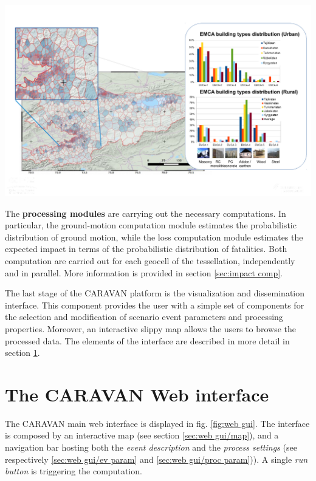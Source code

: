 \documentclass[12p]{article}
\begin{document}
\begin{center}
	\includegraphics[width=\textwidth]{tess_exposure1}
\end{center}

The \textbf{processing modules} are carrying out the necessary
computations. In particular, the ground-motion computation module estimates the
probabilistic distribution of ground motion, while the loss computation module
estimates the expected impact in terms of the probabilistic distribution of
fatalities. Both computation are carried out for each geocell of the
tessellation, independently and in parallel. More information is provided in
section \ref{sec:impact comp}. 

The last stage of the CARAVAN platform is the visualization and dissemination
interface. This component provides the user with a simple set of components for
the selection and modification of scenario event parameters and processing
properties. Moreover, an interactive slippy map allows the users to browse the
processed data. The elements of the interface are described in more detail in
section \ref{sec:web gui}.

\newpage
\section{The CARAVAN Web interface}
\label{sec:web gui}

The CARAVAN main web interface is displayed in fig. \ref{fig:web gui}. The interface is composed by an interactive map (see section \ref{sec:web
gui/map}), and a navigation bar hosting both the \emph{event description} and the
\emph{process settings} (see respectively \ref{sec:web gui/ev param} and
\ref{sec:web gui/proc param})). A single \emph{run button} is triggering the
computation.
\end{document}
